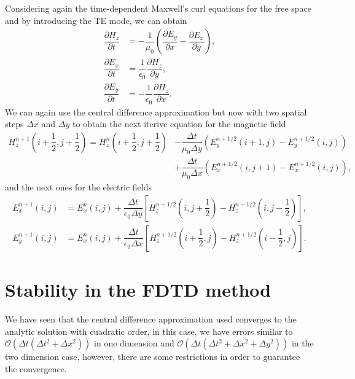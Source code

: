 \documentclass[12pt, oneside]{book}
\begin{document}
\indent Considering again the time-dependent Maxwell's curl equations for the free space and by introducing the TE mode, we can obtain
\begin{align}
    \dfrac{\partial H_z}{\partial t} &= -\dfrac{1}{\mu_0} \left( \dfrac{\partial E_y}{\partial x} - \dfrac{\partial E_x}{\partial y} \right), \\
    \dfrac{\partial E_x}{\partial t} &= \dfrac{1}{\epsilon_0} \dfrac{\partial H_z}{\partial y}, \\
    \dfrac{\partial E_y}{\partial t} &= -\dfrac{1}{\epsilon_0} \dfrac{\partial H_z}{\partial x}. 
\end{align}
We can again use the central difference approximation but now with two spatial steps $\Delta x$ and $\Delta y$ to obtain the next iterive equation for the magnetic field
\begin{equation}
\begin{aligned}
    H_z^{n + 1}\left( i + \dfrac{1}{2},j + \dfrac{1}{2} \right) = H_z^{n}\left( i + \dfrac{1}{2},j + \dfrac{1}{2} \right) &- \dfrac{\Delta t}{\mu_0 \Delta y}\left( E_y^{n + 1/2}(i+1,j) - E_y^{n + 1/2}(i,j) \right) \\
                                                                                                                          &+ \dfrac{\Delta t}{\mu_0 \Delta x}\left( E_x^{n + 1/2}(i,j+1) - E_x^{n + 1/2}(i,j) \right),
\end{aligned}
\end{equation}
and the next ones for the electric fields
\begin{align}
    E_x^{n+1}(i, j) &= E_x^{n}(i, j) + \dfrac{\Delta t}{\epsilon_0 \Delta y}\left[ H_z^{n+1/2}\left( i,j + \dfrac{1}{2} \right) - H_z^{n+1/2}\left( i,j - \dfrac{1}{2} \right) \right], \\
    E_y^{n+1}(i, j) &= E_x^{n}(i, j) + \dfrac{\Delta t}{\epsilon_0 \Delta x}\left[ H_z^{n+1/2}\left( i + \dfrac{1}{2},j \right) - H_z^{n+1/2}\left( i - \dfrac{1}{2},j \right) \right].
\end{align}

\section{Stability in the FDTD method}

We have seen that the central difference approximation used converges to the analytic solution with cuadratic order, in this case, we have errors similar to $\mathcal{O}(\Delta t(\Delta t^2 + \Delta x^2))$ in one dimension and $\mathcal{O}(\Delta t(\Delta t^2 + \Delta x^2 + \Delta y^2))$ in the two dimension case, however, there are some restrictions in order to guarantee the convergence.
\end{document}
